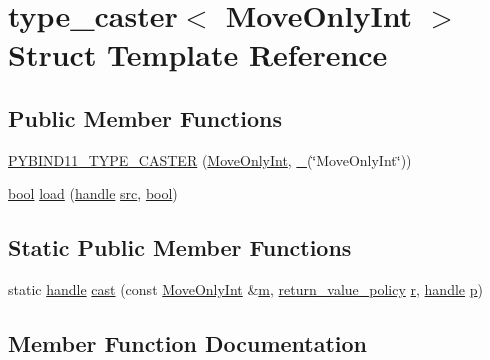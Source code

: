 \hypertarget{structtype__caster_3_01_move_only_int_01_4}{}\section{type\+\_\+caster$<$ Move\+Only\+Int $>$ Struct Template Reference}
\label{structtype__caster_3_01_move_only_int_01_4}
\subsection*{Public Member Functions}
\begin{DoxyCompactItemize}
\item 
\mbox{\hyperlink{structtype__caster_3_01_move_only_int_01_4_a924badf99ed675c554353c2be16c78df}{P\+Y\+B\+I\+N\+D11\+\_\+\+T\+Y\+P\+E\+\_\+\+C\+A\+S\+T\+ER}} (\mbox{\hyperlink{class_move_only_int}{Move\+Only\+Int}}, \mbox{\hyperlink{descr_8h_af114703e20c6527e87163eb2798f74b8}{\+\_\+}}(\char`\"{}Move\+Only\+Int\char`\"{}))
\item 
\mbox{\hyperlink{asdl_8h_af6a258d8f3ee5206d682d799316314b1}{bool}} \mbox{\hyperlink{structtype__caster_3_01_move_only_int_01_4_ae155ce43235348c9fca79b9fe53a85ed}{load}} (\mbox{\hyperlink{classhandle}{handle}} \mbox{\hyperlink{_s_d_l__opengl__glext_8h_a72e0fdf0f845ded60b1fada9e9195cd7}{src}}, \mbox{\hyperlink{asdl_8h_af6a258d8f3ee5206d682d799316314b1}{bool}})
\end{DoxyCompactItemize}
\subsection*{Static Public Member Functions}
\begin{DoxyCompactItemize}
\item 
static \mbox{\hyperlink{classhandle}{handle}} \mbox{\hyperlink{structtype__caster_3_01_move_only_int_01_4_a6e3a875167a3b56518cece7bfdaf489d}{cast}} (const \mbox{\hyperlink{class_move_only_int}{Move\+Only\+Int}} \&\mbox{\hyperlink{_s_d_l__opengl__glext_8h_af593500c283bf1a787a6f947f503a5c2}{m}}, \mbox{\hyperlink{detail_2common_8h_adde72ab1fb0dd4b48a5232c349a53841}{return\+\_\+value\+\_\+policy}} \mbox{\hyperlink{_s_d_l__opengl_8h_a42ce7cdc612e53abee15043f80220d97}{r}}, \mbox{\hyperlink{classhandle}{handle}} \mbox{\hyperlink{_s_d_l__opengl__glext_8h_aa5367c14d90f462230c2611b81b41d23}{p}})
\end{DoxyCompactItemize}


\subsection{Member Function Documentation}
\mbox{\label{structtype__caster_3_01_move_only_int_01_4_a6e3a875167a3b56518cece7bfdaf489d}} 
